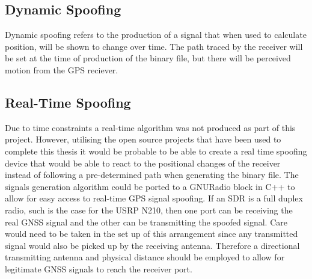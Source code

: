 \subsection{Dynamic Spoofing}
Dynamic spoofing refers to the production of a signal that when used to calculate position, will be shown to change over time. The path traced by the receiver will be
set at the time of production of the binary file, but there will be perceived motion from the GPS reciever.

\subsection{Real-Time Spoofing}
Due to time constraints a real-time algorithm was not produced as part of this project. However, utilising the open source projects that have been used to complete this
thesis it would be probable to be able to create a real time spoofing device that would be able to react to the positional changes of the receiver instead of following a
pre-determined path when generating the binary file. The signals generation algorithm could be ported to a GNURadio block in C++ to allow for easy access to real-time GPS
signal spoofing. If an SDR is a full duplex radio, such is the case for the USRP N210, then one port can be receiving the real GNSS signal and the other can be
transmitting the spoofed signal. Care would need to be taken in the set up of this arrangement since any transmitted signal would also be picked up by the receiving
antenna. Therefore a directional transmitting antenna and physical distance should be employed to allow for legitimate GNSS signals to reach the receiver port. 